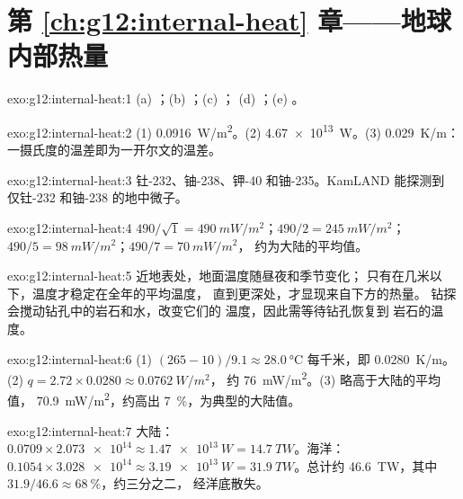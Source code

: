 \section*{第 \ref{ch:g12:internal-heat} 章——地球内部热量}

\begin{solution}{exo:g12:internal-heat:1}
(a) ；(b) ；(c) ；
(d) ；(e) 。
\end{solution}

\begin{solution}{exo:g12:internal-heat:2}
(1) \qty{0.0916}{W/m^2}。(2) \qty{4.67e13}{W}。(3) \qty{0.029}{K/m}：
一摄氏度的温差即为一开尔文的温差。
\end{solution}

\begin{solution}{exo:g12:internal-heat:3}
钍-232、铀-238、钾-40 和铀-235。KamLAND 能探测到
仅钍-232 和铀-238 的地中微子。
\end{solution}

\begin{solution}{exo:g12:internal-heat:4}
$490/\sqrt{1} = \qty{490}{mW/m^2}$；$490/2 = \qty{245}{mW/m^2}$；
$490/5 = \qty{98}{mW/m^2}$；$490/7 = \qty{70}{mW/m^2}$，
约为大陆的平均值。
\end{solution}

\begin{solution}{exo:g12:internal-heat:5}
近地表处，地面温度随昼夜和季节变化；
只有在几米以下，温度才稳定在全年的平均温度，
直到更深处，才显现来自下方的热量。
钻探会搅动钻孔中的岩石和水，改变它们的
温度，因此需等待钻孔恢复到
岩石的温度。
\end{solution}

\begin{solution}{exo:g12:internal-heat:6}
(1) $(265 - 10)/9.1 \approx \qty{28.0}{\celsius}$ 每千米，即
\qty{0.0280}{K/m}。(2) $q = 2.72 \times 0.0280 \approx \qty{0.0762}{W/m^2}$，
约 \qty{76}{mW/m^2}。(3) 略高于大陆的平均值，
\qty{70.9}{mW/m^2}，约高出 \qty{7}{\percent}，为典型的大陆值。
\end{solution}

\begin{solution}{exo:g12:internal-heat:7}
大陆：$0.0709 \times \num{2.073e14} \approx \qty{1.47e13}{W} =
\qty{14.7}{TW}$。海洋：$0.1054 \times \num{3.028e14} \approx
\qty{3.19e13}{W} = \qty{31.9}{TW}$。总计约 \qty{46.6}{TW}，其中
$31.9/46.6 \approx \qty{68}{\percent}$，约三分之二，
经洋底散失。
\end{solution}

